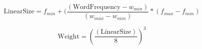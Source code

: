 \documentclass{article}
\begin{document}
	
	
	
	
	
\begin{equation}
	 \text{LinearSize} =  f_{min} + (\frac{ ( \text{WordFrequency} - w_{min} ) } { (w_{max} - w_{min } ) } * (f_{max} - f_{min} ) 
 \end{equation}


\begin{equation}
	\text{Weight} =  (\frac{ ( \text{LinearSize} ) } { 8 }) ^3
\end{equation}
\end{document}
